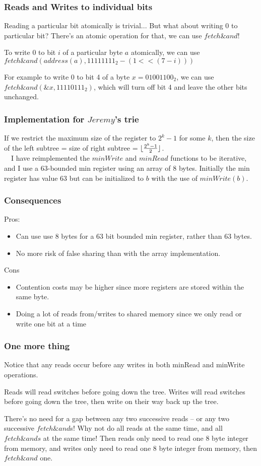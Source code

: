 \documentclass{beamer}
\DeclarePairedDelimiter\floor{\lfloor}{\rfloor}
\begin{document}
\begin{frame}[fragile]
\frametitle{Reads and Writes to individual bits}
Reading a particular bit atomically is trivial...
But what about writing 0 to particular bit? 
There's an atomic operation for that, we can use $fetch\&and$!

To write 0 to bit $i$ of a particular byte $a$ atomically, we can use $fetch\&and(address(a), 11111111_2 - (1 << (7 - i)))$ 

For example to write 0 to bit 4 of a byte $x = 01001100_2$, we can use $fetch\&and(\&x,11110111_2)$, which will turn off bit 4 and leave the other bits unchanged.
\end{frame}
\begin{frame}
	\frametitle{Implementation for $Jeremy$'s trie}
	If we restrict the maximum size of the register to $2^k - 1$ for some $k$, 
	then the size of the left subtree = size of right subtree = $\floor{\frac{2^k-1}{2}}$.
	\\~\
	I have reimplemented the $minWrite$ and $minRead$ functions to be iterative, 
	and I use a 63-bounded min register using an array of 8 bytes.
	Initially the min register has value 63 but can be initialized to $b$ with the use of
	$minWrite(b)$.
\end{frame}
\begin{frame}
	\frametitle{Consequences}
	Pros:
	\begin{itemize}
		\item Can use use 8 bytes for a 63 bit bounded min register, rather than 63 bytes.
		\item No more risk of false sharing than with the array implementation.
	\end{itemize}
	Cons
	\begin{itemize}
		\item Contention costs may be higher since more registers are stored within the same byte.
		\item Doing a lot of reads from/writes to shared memory since we only read or write one bit at a time
	\end{itemize}
\end{frame}
\begin{frame}
	\frametitle{One more thing}
	Notice that any reads occur before any writes in both minRead and minWrite operations.
	
	Reads will read switches before going down the tree.
	Writes will read switches before going down the tree, then write on their way back up the tree.

	There's no need for a gap between any two successive reads -- or any two successive $fetch\&and$s!
	Why not do all reads at the same time, and all $fetch\&ands$ at the same time!
	Then reads only need to read one 8 byte integer from memory, 
	and writes only need to read one 8 byte integer from memory, then $fetch\&and$ one.
\end{frame}
\end{document}
